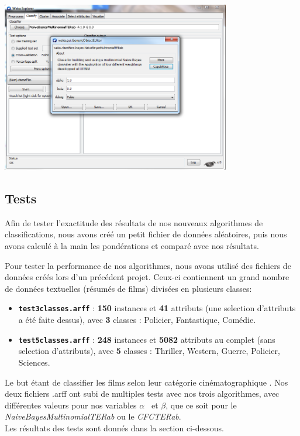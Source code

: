 \documentclass{article}
\begin{document}
\begin{center}
\includegraphics[width=0.75\textwidth]{wekaAB}~\\[1cm]  
\end{center}

\subsection{Tests}
Afin de tester l'exactitude des résultats de nos nouveaux algorithmes de classifications, nous avons créé un petit fichier de données aléatoires, puis nous avons calculé à la main les pondérations et comparé avec nos résultats. 

\bigskip

Pour tester la performance de nos algorithmes, nous avons utilisé des fichiers de données créés lors d'un précédent projet. Ceux-ci contiennent un grand nombre de données textuelles (résumés de films) divisées en plusieurs classes:
\begin{itemize}
\item \texttt{\textbf{test3classes.arff}} : \textbf{150} instances et \textbf{41} attributs (une selection d'attributs a été faite dessus), avec \textbf{3} classes : Policier, Fantastique, Comédie.
\item \texttt{\textbf{test5classes.arff}} : \textbf{248} instances et \textbf{5082} attributs au complet (sans selection d'attributs), avec \textbf{5} classes : Thriller, Western, Guerre, Policier, Sciences.
\end{itemize}
Le but étant de classifier les films selon leur catégorie cinématographique .
Nos deux fichiers .arff ont subi de multiples tests avec nos trois algorithmes, avec différentes valeurs pour nos variables $\alpha$ \ et $\beta$, que ce soit pour le \textit{NaiveBayesMultinomialTERab} ou le \textit{CFCTERab}.\\
Les résultats des tests sont donnés dans la section ci-dessous.
\end{document}
